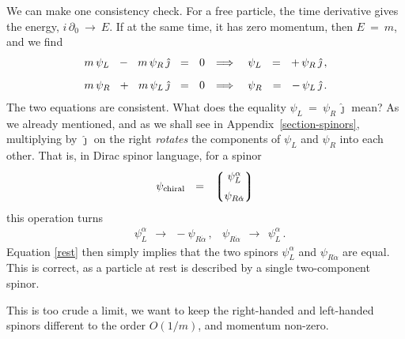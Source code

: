 \documentclass[epsfig,12pt]{article}
\newcommand{\p}{\partial}
\newcommand{\lgr}{\left\lgroup}
\newcommand{\rgr}{\right\rgroup}
\newcommand{\jj}{\hat\jmath}
\begin{document}
	We can make one consistency check.
	For a free particle, the time derivative gives the energy,
	$ i\,\p_0 ~\to~ E $.
	If at the same time, it has zero momentum, then $ E ~=~ m $, and
	we find
\begin{align}
%
\notag
	&
	m\,\psi_L  ~~-~~  m\,\psi_R\,\jj	~~=~~	0
	&
	\Longrightarrow\quad \psi_L	~~=~~	+\,\psi_R\,\jj\,,
	\\[2mm]
%
\label{rest}
	&
	m\,\psi_R  ~~+~~  m\,\psi_L\,\jj	~~=~~	0
	&
	\Longrightarrow\quad \psi_R	~~=~~	-\,\psi_L\,\jj\,.
\end{align}
	The two equations are consistent.
	What does the equality $ \psi_L ~=~ \psi_R\,\jj $ mean?
	As we already mentioned, and as we shall see in Appendix~\ref{section-spinors},
	multiplying by $ \jj $ on the right
	\emph{rotates} the components of $ \psi_L $ and $ \psi_R $ into
	each other.
	That is, in Dirac spinor language, for a spinor
\begin{equation}
	\psi_\text{chiral}	~~=~~	\lgr 
						\begin{matrix}
							\psi_L^\alpha	\\[2mm]
							\psi_{R\dot\alpha}
						\end{matrix}
					\rgr
\end{equation}
	this operation turns
\begin{align}
	&
	\psi_L^\alpha	~~\to~~		-\psi_{R\dot\alpha}\,,
	&
	\psi_{R\dot\alpha}	~~\to~~		\psi_L^\alpha\,.
\end{align}
	Equation \eqref{rest} then simply implies that the two spinors
	$ \psi_L^\alpha $ and $ \psi_{R\dot\alpha} $ are equal.
	This is correct, as a particle at rest is described by a single
	two-component spinor.

	This is too crude a limit, we want to keep the right-handed and left-handed
	spinors different to the order $ O(1/m) $, and momentum non-zero.
	
\end{document}
